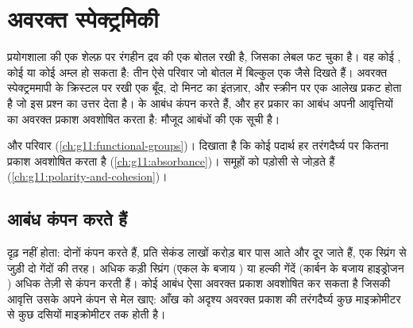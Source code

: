 \chapter{अवरक्त स्पेक्ट्रमिकी}\label{ch:g11:infrared}

प्रयोगशाला की एक शेल्फ़ पर रंगहीन द्रव की एक बोतल रखी है, जिसका लेबल फट चुका
है। वह कोई , कोई  या कोई अम्ल हो सकता है: तीन ऐसे परिवार जो बोतल में
बिल्कुल एक जैसे दिखते हैं। अवरक्त स्पेक्ट्रममापी के क्रिस्टल पर रखी एक बूँद, दो मिनट
का इंतज़ार, और स्क्रीन पर एक आलेख प्रकट होता है जो इस प्रश्न का उत्तर देता है।  के
आबंध कंपन करते हैं, और हर प्रकार का आबंध अपनी आवृत्तियों का अवरक्त प्रकाश
अवशोषित करता है:  मौजूद आबंधों की एक सूची है।

\begin{recall}
 और परिवार (\cref{ch:g11:functional-groups})।  दिखाता है कि कोई पदार्थ हर तरंगदैर्घ्य पर कितना प्रकाश अवशोषित करता है
(\cref{ch:g11:absorbance})।  
समूहों को पड़ोसी  से जोड़ते हैं (\cref{ch:g11:polarity-and-cohesion})।
\end{recall}

\section{आबंध कंपन करते हैं}

 दृढ़ नहीं होता: दोनों  कंपन करते हैं, प्रति सेकंड लाखों करोड़
बार पास आते और दूर जाते हैं, एक स्प्रिंग से जुड़ी दो गेंदों की तरह। अधिक कड़ी
स्प्रिंग (एकल के बजाय ) या हल्की गेंदें (कार्बन  के बजाय हाइड्रोजन
) अधिक तेज़ी से कंपन करती हैं। कोई आबंध ऐसा अवरक्त प्रकाश अवशोषित कर सकता है
जिसकी आवृत्ति उसके अपने कंपन से मेल खाए: आँख को अदृश्य अवरक्त प्रकाश की तरंगदैर्घ्य
कुछ माइक्रोमीटर से कुछ दसियों माइक्रोमीटर तक होती है।

